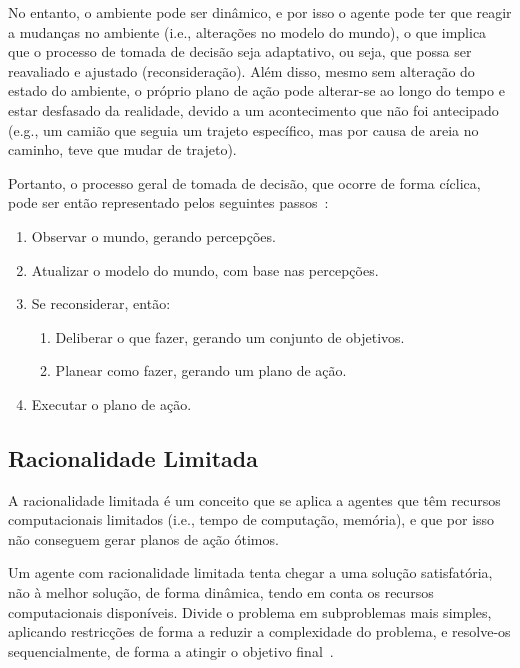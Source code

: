No entanto, o ambiente pode ser dinâmico, e por isso o agente pode ter que reagir a mudanças no ambiente (i.e., alterações no modelo do mundo), o que implica que o processo de tomada de decisão seja adaptativo, ou seja, que possa ser reavaliado e ajustado (reconsideração).
Além disso, mesmo sem alteração do estado do ambiente, o próprio plano de ação pode alterar-se ao longo do tempo e estar desfasado da realidade, devido a um acontecimento que não foi antecipado (e.g., um camião que seguia um trajeto específico, mas por causa de areia no caminho, teve que mudar de trajeto).

Portanto, o processo geral de tomada de decisão, que ocorre de forma cíclica, pode ser então representado pelos seguintes passos~\cite{isel:iasa:slides:arq-agentes-deliberativos}:

\begin{enumerate}
    \item Observar o mundo, gerando percepções.
    \item Atualizar o modelo do mundo, com base nas percepções.
    \item Se reconsiderar, então:
    \begin{enumerate}
        \item Deliberar o que fazer, gerando um conjunto de objetivos.
        \item Planear como fazer, gerando um plano de ação.
    \end{enumerate}
    \item Executar o plano de ação.
\end{enumerate}

\subsection{Racionalidade Limitada}\label{subsec:racionalidade-limitada}

A racionalidade limitada é um conceito que se aplica a agentes que têm recursos computacionais limitados (i.e., tempo de computação, memória), e que por isso não conseguem gerar planos de ação ótimos.

Um agente com racionalidade limitada tenta chegar a uma solução satisfatória, não à melhor solução, de forma dinâmica, tendo em conta os recursos computacionais disponíveis.
Divide o problema em subproblemas mais simples, aplicando restricções de forma a reduzir a complexidade do problema, e resolve-os sequencialmente, de forma a atingir o objetivo final~\cite{isel:iasa:slides:arq-agentes-deliberativos}.

